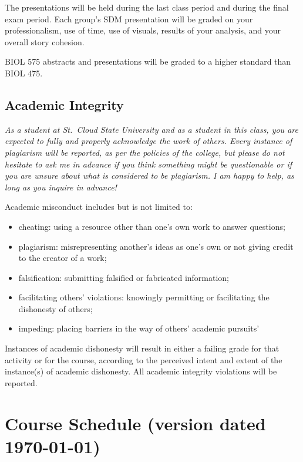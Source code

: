 \documentclass{tufte-handout}
\begin{document}
\begin{fullwidth}
The presentations will be held during the last class period and during the final exam period. Each group's SDM presentation will be graded on your professionalism, use of time, use of visuals, results of your analysis, and your overall story cohesion. 

BIOL 575 abstracts and presentations will be graded to a higher standard than BIOL 475. 



\subsection{Academic Integrity}



\emph{As a student at St.\ Cloud State University and as a student in this class, you are expected to fully and properly acknowledge the work of others. Every instance of plagiarism will be reported, as per the policies of the college, but please do not hesitate to ask me in advance if you think something might be questionable or if you are unsure about what is considered to be plagiarism. I am happy to help, as long as you inquire in advance! }

Academic misconduct includes but is not limited to:

\begin{itemize}
	\item cheating: using a resource other than one's own work to answer questions;
	\item plagiarism: misrepresenting another's ideas as one's own or not giving credit to the creator of a work;
	\item falsification: submitting falsified or fabricated information;
	\item facilitating others' violations: knowingly permitting or facilitating the dishonesty of others;
	\item impeding: placing barriers in the way of others' academic pursuits'
\end{itemize}

Instances of academic dishonesty will result in either a failing grade for that activity or for the course, according to the perceived intent and extent of the instance(s) of academic dishonesty.
All academic integrity violations will be reported.






\section{Course Schedule (version dated \today)}


\end{fullwidth}
\end{document}
